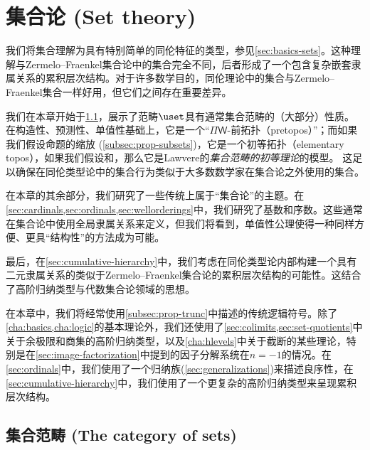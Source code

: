 \chapter{集合论 (Set theory)}
\label{cha:set-math}

%

我们将集合理解为具有特别简单的同伦特征的类型，参见\cref{sec:basics-sets}。这种理解与Zermelo--Fraenkel集合论中的集合完全不同，后者形成了一个包含复杂嵌套隶属关系的累积层次结构。对于许多数学目的，同伦理论中的集合与Zermelo--Fraenkel集合一样好用，但它们之间存在重要差异。

我们在本章开始于\cref{sec:piw-pretopos}，展示了范畴$\uset$具有通常集合范畴的（大部分）性质。
%
%
在构造性、预测性、单值性基础上，它是一个``$\Pi\mathsf{W}$-前拓扑（pretopos）''；而如果我们假设命题的缩放
%
(\cref{subsec:prop-subsets})，它是一个初等拓扑（elementary topos），如果我们假设\LEM{}和\choice{}，那么它是Lawvere的\emph{集合范畴的初等理论}的模型。
%
这足以确保在同伦类型论中的集合行为类似于大多数数学家在集合论之外使用的集合。

在本章的其余部分，我们研究了一些传统上属于“集合论”的主题。在\cref{sec:cardinals,sec:ordinals,sec:wellorderings}中，我们研究了基数和序数。这些通常在集合论中使用全局隶属关系来定义，但我们将看到，单值性公理使得一种同样方便、更具“结构性”的方法成为可能。

最后，在\cref{sec:cumulative-hierarchy}中，我们考虑在同伦类型论内部构建一个具有二元隶属关系的类似于Zermelo--Fraenkel集合论的累积层次结构的可能性。这结合了高阶归纳类型与代数集合论领域的思想。
%
%

在本章中，我们将经常使用\cref{subsec:prop-trunc}中描述的传统逻辑符号。除了\cref{cha:basics,cha:logic}的基本理论外，我们还使用了\cref{sec:colimits,sec:set-quotients}中关于余极限和商集的高阶归纳类型，以及\cref{cha:hlevels}中关于截断的某些理论，特别是在\cref{sec:image-factorization}中提到的因子分解系统在$n=-1$的情况。在\cref{sec:ordinals}中，我们使用了一个归纳族(\cref{sec:generalizations})来描述良序性，在\cref{sec:cumulative-hierarchy}中，我们使用了一个更复杂的高阶归纳类型来呈现累积层次结构。


\section{集合范畴 (The category of sets)}
\label{sec:piw-pretopos}

